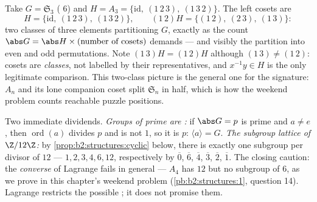 \begin{example}\label{ex:b2:structures:cosets}
Take $G = \mathfrak{S}_3$ ( $6$) and $H = A_3 =
\{\mathrm{id},\ (1\,2\,3),\ (1\,3\,2)\}$. The left cosets are
\[
H = \{\mathrm{id},\ (1\,2\,3),\ (1\,3\,2)\},
\qquad
(1\,2)H = \{(1\,2),\ (2\,3),\ (1\,3)\} :
\]
two classes of three elements partitioning $G$, exactly as the
count $\abs G = \abs H \times (\text{number of cosets})$
demands --- and visibly the partition into even and odd
permutations. Note $(1\,3)H = (1\,2)H$ although $(1\,3) \neq
(1\,2)$: cosets are \emph{classes}, not labelled by their
representatives, and $x^{-1}y \in H$ is the only legitimate
comparison. This two-class picture is the general one for the
signature: $A_n$ and its lone companion coset split
$\mathfrak{S}_n$ in half, which is how the weekend problem
counts reachable puzzle positions.
\end{example}

\begin{example}\label{ex:b2:structures:lagrangeapp}
Two immediate dividends. \emph{Groups of prime  are :}
if $\abs G = p$ is prime and $a \neq e$, then
$\operatorname{ord}(a)$ divides $p$ and is not $1$, so it is $p$:
$\langle a\rangle = G$. \emph{The subgroup lattice of $\Z/12\Z$:}
by \cref{prop:b2:structures:cyclic} below, there is exactly one
subgroup per divisor of $12$ ---  $1, 2, 3, 4, 6, 12$,
 respectively by $\overline 0$, $\overline 6$, $\overline
4$, $\overline 3$, $\overline 2$, $\overline 1$. The closing
caution: the \emph{converse} of Lagrange fails in general --- $A_4$
has  $12$ but no subgroup of  $6$, as we prove in this
chapter's weekend problem (\cref{pb:b2:structures:1}, question 14).
Lagrange restricts the possible ; it does not promise them.
\end{example}


